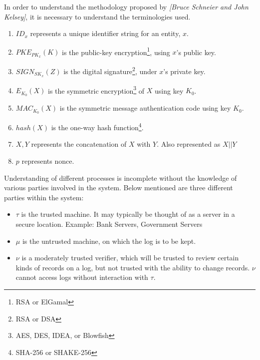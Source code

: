 \documentclass[12pt, letter]{article}
\newcommand\paperAuthors[2]{[#1 and #2]}
\newcommand\makePaperAuthors{\paperAuthors{Bruce Schneier}{John Kelsey}}
\begin{document}
In order to understand the methodology proposed by \textit{\makePaperAuthors}, it is necessary to understand the terminologies used.
\renewcommand{\labelenumi}{(\roman{enumi})}
\begin{enumerate}
    \item $ID_x$ represents a unique identifier string for an entity, $x$. 
    
    \item $PKE_{PK_x} (K)$ is the public-key encryption\footnote{RSA or ElGamal}, using $x$’s public key.

    \item $SIGN_{SK_x}(Z)$ is the digital signature\footnote{RSA or DSA}, under $x$’s private key.

    \item $E_{K_0}(X)$ is the symmetric encryption\footnote{AES, DES, IDEA, or Blowfish} of $X$ using key $K_0$. 

    \item $MAC_{K_0}(X)$ is the symmetric message authentication code using key $K_0$. 

    \item $hash(X)$ is the one-way hash function\footnote{SHA-256 or SHAKE-256}.

    \item $X, Y$ represents the concatenation of $X$ with $Y$. Also represented as $X || Y$

    \item $p$ represents nonce.
\end{enumerate}

Understanding of different processes is incomplete without the knowledge of various parties involved in the system. Below mentioned are three different parties within the system:

\begin{itemize}
    \item $\tau$ is the trusted machine. It may typically be thought of as a server in a secure location. Example: Bank Servers, Government Servers
    
    \item $\mu$ is the untrusted machine, on which the log is to be kept.
    
    \item $\nu$ is a moderately trusted verifier, which will be trusted to review certain kinds of records on a log, but not trusted with the ability to change records. $\nu$ cannot access logs without interaction with $\tau$.
\end{itemize}
\end{document}

